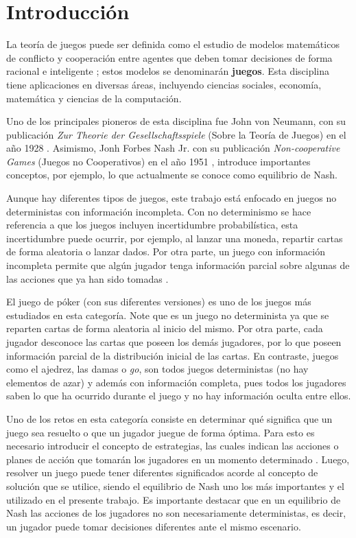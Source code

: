 \chapter*{Introducción}

La teoría de juegos puede ser definida como el estudio de modelos matemáticos de conflicto y cooperación entre agentes que deben tomar decisiones de forma racional e inteligente \cite[p.~1]{bib:game-theory-book}; estos modelos se denominarán \textbf{juegos}. Esta disciplina tiene aplicaciones en diversas áreas, incluyendo ciencias sociales, economía, matemática y ciencias de la computación.

Uno de los principales pioneros de esta disciplina fue John von Neumann, con su publicación \textit{Zur Theorie der Gesellschaftsspiele} (Sobre la Teoría de Juegos) en el año 1928 \cite{bib:von-neumann}. Asimismo, Jonh Forbes Nash Jr. con su publicación \textit{Non-cooperative Games} (Juegos no Cooperativos) en el año 1951 \cite{bib:nash}, introduce importantes conceptos, por ejemplo, lo que actualmente se conoce como equilibrio de Nash.

Aunque hay diferentes tipos de juegos, este trabajo está enfocado en juegos no deterministas con información incompleta. Con no determinismo se hace referencia a que los juegos incluyen incertidumbre probabilística, esta incertidumbre puede ocurrir, por ejemplo, al lanzar una moneda, repartir cartas de forma aleatoria o lanzar dados. Por otra parte, un juego con información incompleta permite que algún jugador tenga información parcial sobre algunas de las acciones que ya han sido tomadas \cite[p.~199]{bib:course-game-theory}.

El juego de póker (con sus diferentes versiones) es uno de los juegos más estudiados en esta categoría. Note que es un juego no determinista ya que se reparten cartas de forma aleatoria al inicio del mismo. Por otra parte, cada jugador desconoce las cartas que poseen los demás jugadores, por lo que poseen información parcial de la distribución inicial de las cartas. En contraste, juegos como el ajedrez, las damas o \textit{go}, son todos juegos deterministas (no hay elementos de azar) y además con información completa, pues todos los jugadores saben lo que ha ocurrido durante el juego y no hay información oculta entre ellos.

Uno de los retos en esta categoría consiste en determinar qué significa que un juego sea resuelto o que un jugador juegue de forma óptima. Para esto es necesario introducir el concepto de estrategias, las cuales indican las acciones o planes de acción que tomarán los jugadores en un momento determinado \cite[p.~24]{bib:teoria-juegos-es}. Luego, resolver un juego puede tener diferentes significados acorde al concepto de solución que se utilice, siendo el equilibrio de Nash uno los más importantes y el utilizado en el presente trabajo. Es importante destacar que en un equilibrio de Nash las acciones de los jugadores no son necesariamente deterministas, es decir, un jugador puede tomar decisiones diferentes ante el mismo escenario.

